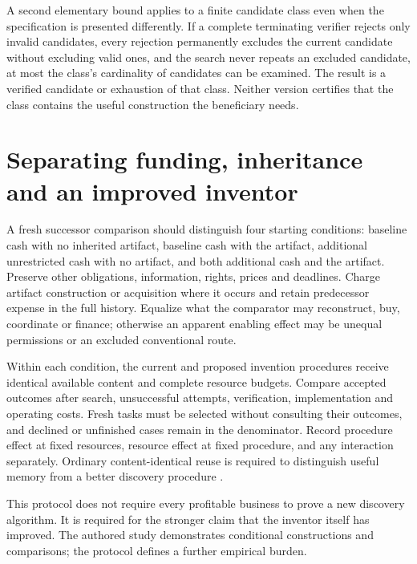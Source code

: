 A second elementary bound applies to a finite candidate class even when the specification is presented differently. If a complete terminating verifier rejects only invalid candidates, every rejection permanently excludes the current candidate without excluding valid ones, and the search never repeats an excluded candidate, at most the class's cardinality of candidates can be examined. The result is a verified candidate or exhaustion of that class. Neither version certifies that the class contains the useful construction the beneficiary needs.

\section{Separating funding, inheritance and an improved inventor}\label{app:identification}

A fresh successor comparison should distinguish four starting conditions: baseline cash with no inherited artifact, baseline cash with the artifact, additional unrestricted cash with no artifact, and both additional cash and the artifact. Preserve other obligations, information, rights, prices and deadlines. Charge artifact construction or acquisition where it occurs and retain predecessor expense in the full history. Equalize what the comparator may reconstruct, buy, coordinate or finance; otherwise an apparent enabling effect may be unequal permissions or an excluded conventional route.

Within each condition, the current and proposed invention procedures receive identical available content and complete resource budgets. Compare accepted outcomes after search, unsuccessful attempts, verification, implementation and operating costs. Fresh tasks must be selected without consulting their outcomes, and declined or unfinished cases remain in the denominator. Record procedure effect at fixed resources, resource effect at fixed procedure, and any interaction separately. Ordinary content-identical reuse is required to distinguish useful memory from a better discovery procedure \cite{superalpha,outevolve,outaccelerate}.

This protocol does not require every profitable business to prove a new discovery algorithm. It is required for the stronger claim that the inventor itself has improved. The authored study demonstrates conditional constructions and comparisons; the protocol defines a further empirical burden.
